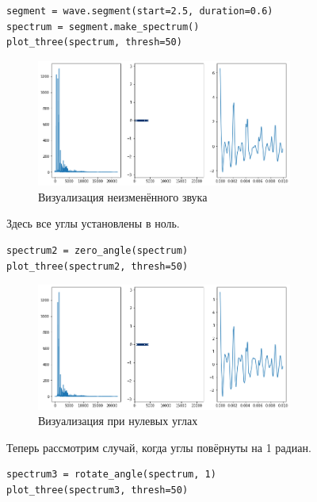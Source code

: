 \documentclass[a4paper,12pt]{report}
\begin{document}
\begin{lstlisting}[caption=Визуализация неизменённого звука]
segment = wave.segment(start=2.5, duration=0.6)
spectrum = segment.make_spectrum()
plot_three(spectrum, thresh=50)
\end{lstlisting}

\begin{figure}[H]
        \centering
        \includegraphics[width=0.75\textwidth]{lab6_fig3_18.png}
        \caption{Визуализация неизменённого звука}
        \label{fig:lab6_fig3_18}
\end{figure}

Здесь все углы установлены в ноль.

\begin{lstlisting}[caption=Визуализация при нулевых углах]
spectrum2 = zero_angle(spectrum)
plot_three(spectrum2, thresh=50)
\end{lstlisting}

\begin{figure}[H]
        \centering
        \includegraphics[width=0.75\textwidth]{lab6_fig3_19.png}
        \caption{Визуализация при нулевых углах}
        \label{fig:lab6_fig3_19}
\end{figure}

Теперь рассмотрим случай, когда углы повёрнуты на 1 радиан.

\begin{lstlisting}[caption=Визуализация при повороте углов]
spectrum3 = rotate_angle(spectrum, 1)
plot_three(spectrum3, thresh=50)
\end{lstlisting}
\end{document}
